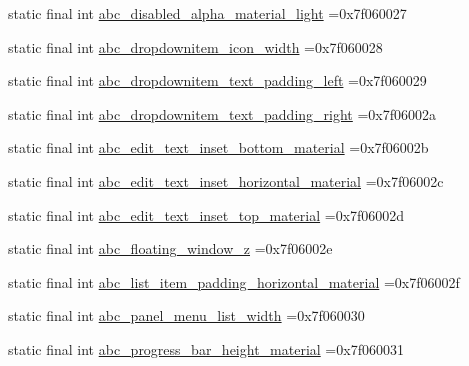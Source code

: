 \begin{DoxyCompactItemize}
\item 
static final int \mbox{\hyperlink{classbr_1_1unb_1_1cic_1_1mp_1_1marketmaster_1_1test_1_1R_1_1dimen_a167bad6972fbb9d1ca22e3f217d0fb6d}{abc\+\_\+disabled\+\_\+alpha\+\_\+material\+\_\+light}} =0x7f060027
\item 
static final int \mbox{\hyperlink{classbr_1_1unb_1_1cic_1_1mp_1_1marketmaster_1_1test_1_1R_1_1dimen_a0d1f6bac47056cdd20efd60b890ca8be}{abc\+\_\+dropdownitem\+\_\+icon\+\_\+width}} =0x7f060028
\item 
static final int \mbox{\hyperlink{classbr_1_1unb_1_1cic_1_1mp_1_1marketmaster_1_1test_1_1R_1_1dimen_a2dea068a42d4b4078f3a58d57c34dafc}{abc\+\_\+dropdownitem\+\_\+text\+\_\+padding\+\_\+left}} =0x7f060029
\item 
static final int \mbox{\hyperlink{classbr_1_1unb_1_1cic_1_1mp_1_1marketmaster_1_1test_1_1R_1_1dimen_a67d7831df90d7a095afc86208d5aa60d}{abc\+\_\+dropdownitem\+\_\+text\+\_\+padding\+\_\+right}} =0x7f06002a
\item 
static final int \mbox{\hyperlink{classbr_1_1unb_1_1cic_1_1mp_1_1marketmaster_1_1test_1_1R_1_1dimen_a7bab67c1fd6eb3ddc41ee8a783e63622}{abc\+\_\+edit\+\_\+text\+\_\+inset\+\_\+bottom\+\_\+material}} =0x7f06002b
\item 
static final int \mbox{\hyperlink{classbr_1_1unb_1_1cic_1_1mp_1_1marketmaster_1_1test_1_1R_1_1dimen_a33f387c34525083eee5beb29cc5faafb}{abc\+\_\+edit\+\_\+text\+\_\+inset\+\_\+horizontal\+\_\+material}} =0x7f06002c
\item 
static final int \mbox{\hyperlink{classbr_1_1unb_1_1cic_1_1mp_1_1marketmaster_1_1test_1_1R_1_1dimen_ac8a60e058d907962daa599bc8997abc3}{abc\+\_\+edit\+\_\+text\+\_\+inset\+\_\+top\+\_\+material}} =0x7f06002d
\item 
static final int \mbox{\hyperlink{classbr_1_1unb_1_1cic_1_1mp_1_1marketmaster_1_1test_1_1R_1_1dimen_ae5700a00d466d9bcbfaba68a04587db9}{abc\+\_\+floating\+\_\+window\+\_\+z}} =0x7f06002e
\item 
static final int \mbox{\hyperlink{classbr_1_1unb_1_1cic_1_1mp_1_1marketmaster_1_1test_1_1R_1_1dimen_afc86652002f1d596ebbf61b52e5b0fd5}{abc\+\_\+list\+\_\+item\+\_\+padding\+\_\+horizontal\+\_\+material}} =0x7f06002f
\item 
static final int \mbox{\hyperlink{classbr_1_1unb_1_1cic_1_1mp_1_1marketmaster_1_1test_1_1R_1_1dimen_a09f7b9b5b3dc11d6f312df2a0c5ab825}{abc\+\_\+panel\+\_\+menu\+\_\+list\+\_\+width}} =0x7f060030
\item 
static final int \mbox{\hyperlink{classbr_1_1unb_1_1cic_1_1mp_1_1marketmaster_1_1test_1_1R_1_1dimen_a4e4f13a2d16acf606e4c79048a253668}{abc\+\_\+progress\+\_\+bar\+\_\+height\+\_\+material}} =0x7f060031

\end{DoxyCompactItemize}
